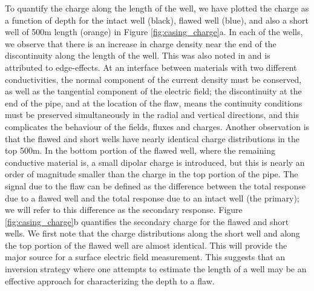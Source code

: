 

To quantify the charge along the length of the well, we have plotted the charge as a function of depth for the intact well (black), flawed well (blue), and also a short well of 500m length (orange) in Figure \ref{fig:casing_charge}a. In each of the wells, we observe that there is an increase in charge density near the end of the discontinuity along the length of the well. This was also noted  in \cite{Griffiths1997, Heagy2018a} and is attributed to edge-effects. At an interface between materials with two different conductivities, the normal component of the current density must be conserved, as well as the tangential component of the electric field; the discontinuity at the end of the pipe, and at the location of the flaw, means the continuity conditions must be preserved simultaneously in the radial and vertical directions, and this complicates the behaviour of the fields, fluxes and charges. Another observation is that the flawed and short wells have nearly identical charge distributions in the top 500m. In the bottom portion of the flawed well, where the remaining conductive material is, a small dipolar charge is introduced, but this is nearly an order of magnitude smaller than the charge in the top portion of the pipe. The signal due to the flaw can be defined as the difference between the total response due to a flawed well and the total response due to an intact well (the primary); we will refer to this difference as the secondary response. Figure \ref{fig:casing_charge}b quantifies the secondary charge for the flawed and short wells. We first note that the charge distributions along the short well and along the top portion of the flawed well are almost identical. This will provide the major source for a surface electric field measurement. This suggests that an inversion strategy where one attempts to estimate the length of a well may be an effective approach for characterizing the depth to a flaw.




